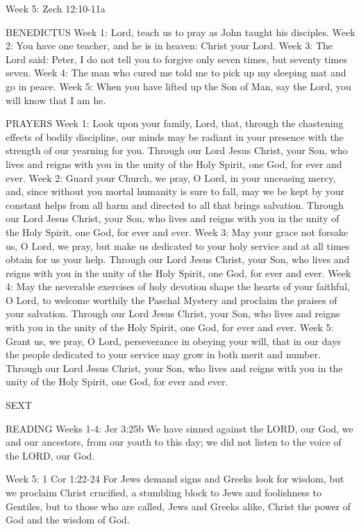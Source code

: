 Week 5:    Zech 12:10-11a    

BENEDICTUS
Week 1:	Lord, teach us to pray as John taught his disciples.
Week 2:	You have one teacher, and he is in heaven: Christ your Lord.
Week 3:	The Lord said: Peter, I do not tell you to forgive only seven times, but seventy times seven.
Week 4:	The man who cured me told me to pick up my sleeping mat and go in peace.
Week 5:	When you have lifted up the Son of Man, say the Lord, you will know that I am he.

PRAYERS
Week 1:	Look upon your family, Lord, that, through the chastening effects of bodily discipline, our minds may be radiant in your presence with the strength of our yearning for you. Through our Lord Jesus Christ, your Son, who lives and reigns with you in the unity of the Holy Spirit, one God, for ever and ever.
Week 2:	Guard your Church, we pray, O Lord, in your unceasing mercy, and, since without you mortal humanity is sure to fall, may we be kept by your constant helps from all harm and directed to all that brings salvation. Through our Lord Jesus Christ, your Son, who lives and reigns with you in the unity of the Holy Spirit, one God, for ever and ever.
Week 3:	May your grace not forsake us, O Lord, we pray, but make us dedicated to your holy service and at all times obtain for us your help. Through our Lord Jesus Christ, your Son, who lives and reigns with you in the unity of the Holy Spirit, one God, for ever and ever.
Week 4:	May the neverable exercises of holy devotion shape the hearts of your faithful, O Lord, to welcome worthily the Paschal Mystery and proclaim the praises of your salvation. Through our Lord Jesus Christ, your Son, who lives and reigns with you in the unity of the Holy Spirit, one God, for ever and ever.
Week 5:	Grant us, we pray, O Lord, perseverance in obeying your will, that in our days the people dedicated to your service may grow in both merit and number. Through our Lord Jesus Christ, your Son, who lives and reigns with you in the unity of the Holy Spirit, one God, for ever and ever.

\begin{flushleft}\normalsize{\uppercase{SEXT\\}}\end{flushleft}
READING
Weeks 1-4:    Jer 3:25b    We have sinned against the LORD, our God, we and our ancestors, from our youth to this day; we did not listen to the voice of the LORD, our God.

Week 5:    1 Cor 1:22-24    For Jews demand signs and Greeks look for wisdom, but we proclaim Christ crucified, a stumbling block to Jews and foolishness to Gentiles, but to those who are called, Jews and Greeks alike, Christ the power of God and the wisdom of God. 

